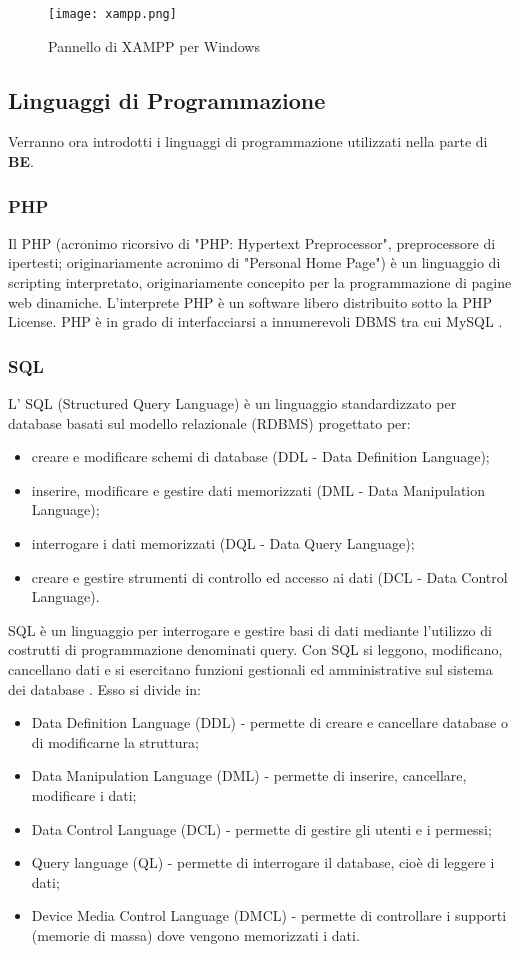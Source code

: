  \begin{figure}[h]
	\centering
	\caption{Pannello di XAMPP per Windows}
	\texttt{[image: xampp.png]}
\end{figure}

\newpage

\subsection{Linguaggi di Programmazione}
Verranno ora introdotti i linguaggi di programmazione utilizzati nella parte di \textbf{BE}.
\subsubsection{PHP}
Il PHP (acronimo ricorsivo di "PHP: Hypertext Preprocessor", preprocessore di ipertesti; originariamente acronimo di "Personal Home Page") è un linguaggio di scripting interpretato, originariamente concepito per la programmazione di pagine web dinamiche. L'interprete PHP è un software libero distribuito sotto la PHP License.
\newline
PHP è in grado di interfacciarsi a innumerevoli DBMS tra cui MySQL \cite{sito_php}. 

\subsubsection{SQL}
L' SQL (Structured Query Language) è un linguaggio standardizzato per database basati sul modello relazionale (RDBMS) progettato per: 
\begin{itemize}
\item creare e modificare schemi di database (DDL - Data Definition Language);
\item inserire, modificare e gestire dati memorizzati (DML - Data Manipulation Language);
\item interrogare i dati memorizzati (DQL - Data Query Language);
\item creare e gestire strumenti di controllo ed accesso ai dati (DCL - Data Control Language). 
\end{itemize}
SQL è un linguaggio per interrogare e gestire basi di dati mediante l'utilizzo di costrutti di programmazione denominati query. Con SQL si leggono, modificano, cancellano dati e si esercitano funzioni gestionali ed amministrative sul sistema dei database \cite{sito_sql}. 
Esso si divide in:
\begin{itemize}
\item Data Definition Language (DDL) - permette di creare e cancellare database o di modificarne la struttura;
\item Data Manipulation Language (DML) - permette di inserire, cancellare, modificare i dati;
\item Data Control Language (DCL) - permette di gestire gli utenti e i permessi;
\item Query language (QL) - permette di interrogare il database, cioè di leggere i dati;
\item Device Media Control Language (DMCL) - permette di controllare i supporti (memorie di massa) dove vengono memorizzati i dati.
\end{itemize}
\newpage

